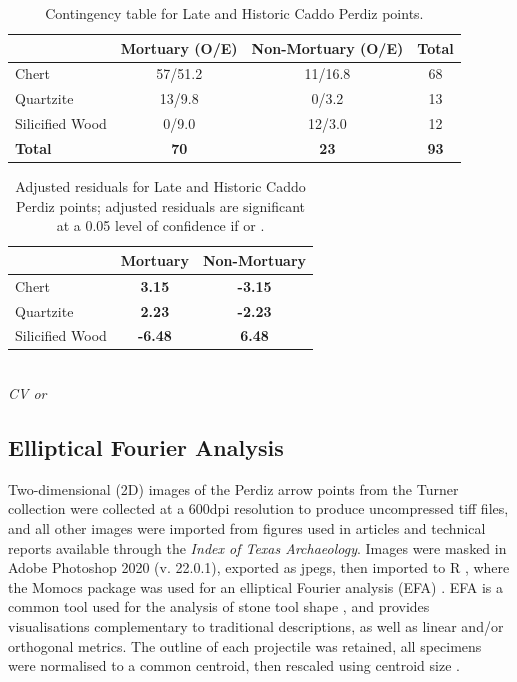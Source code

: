 \documentclass[review]{elsarticle}
\begin{document}
\begin{table}[tbh]\centering
\footnotesize
\caption{Contingency table for Late and Historic Caddo Perdiz points.}
\centering
\begin{tabular}{lccc}
\hline
 & Mortuary (O/E) & Non-Mortuary (O/E) & Total\\
\hline
Chert & 57/51.2 & 11/16.8 & 68\\
Quartzite & 13/9.8 & 0/3.2 & 13\\
Silicified Wood & 0/9.0 & 12/3.0 & 12\\
\hline
\textbf{Total} & \textbf{70} & \textbf{23} & \textbf{93}\\
\hline
\end{tabular}
\label{tab:Tbl3}
\end{table}

\begin{table}[tbh]\centering
\footnotesize
\caption{Adjusted residuals for Late and Historic Caddo Perdiz points; adjusted residuals are significant at a 0.05 level of confidence if \textbf{} or \textbf{}.}
\centering
\begin{tabular}{lcc}
\hline
 & Mortuary & Non-Mortuary\\
\hline
Chert & \textbf{3.15} & \textbf{-3.15}\\
Quartzite & \textbf{2.23} & \textbf{-2.23}\\
Silicified Wood & \textbf{-6.48} & \textbf{6.48}\\
\hline
\end{tabular}\\
\textit{CV  or }
\label{tab:Tbl4}
\end{table}

\subsection*{Elliptical Fourier Analysis}

Two-dimensional (2D) images of the Perdiz arrow points from the Turner collection were collected at a 600dpi resolution to produce uncompressed tiff files, and all other images were imported from figures used in articles and technical reports available through the \textit{Index of Texas Archaeology}. Images were masked in Adobe Photoshop 2020 (v. 22.0.1), exported as jpegs, then imported to R \citep{RN8584}, where the Momocs package was used for an elliptical Fourier analysis (EFA) \citep{RN8925}. EFA is a common tool used for the analysis of stone tool shape \citep{RN2805,RN6313,RN5230,RN5225,RN5227,RN8358,RN8967,RN5231,RN7164}, and provides visualisations complementary to traditional descriptions, as well as linear and/or orthogonal metrics. The outline of each projectile was retained, all specimens were normalised to a common centroid, then rescaled using centroid size \citep{RN8923}. 
\end{document}
